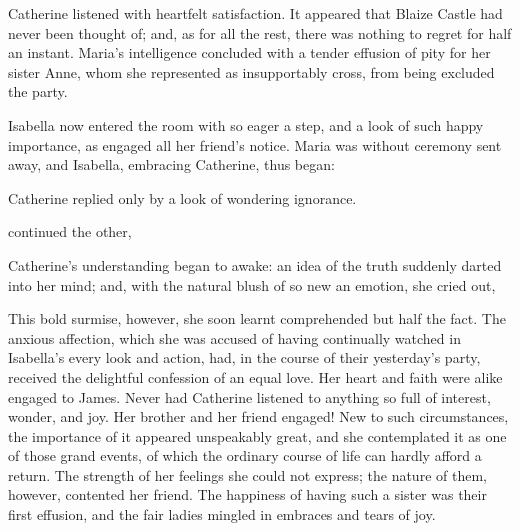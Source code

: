 Catherine listened with heartfelt satisfaction. It appeared that Blaize Castle had never been thought of; and, as for all the rest, there was nothing to regret for half an instant. Maria's intelligence concluded with a tender effusion of pity for her sister Anne, whom she represented as insupportably cross, from being excluded the party.


Isabella now entered the room with so eager a step, and a look of such happy importance, as engaged all her friend's notice. Maria was without ceremony sent away, and Isabella, embracing Catherine, thus began: 

Catherine replied only by a look of wondering ignorance.

 continued the other, 

Catherine's understanding began to awake: an idea of the truth suddenly darted into her mind; and, with the natural blush of so new an emotion, she cried out, 

This bold surmise, however, she soon learnt comprehended but half the fact. The anxious affection, which she was accused of having continually watched in Isabella's every look and action, had, in the course of their yesterday's party, received the delightful confession of an equal love. Her heart and faith were alike engaged to James. Never had Catherine listened to anything so full of interest, wonder, and joy. Her brother and her friend engaged! New to such circumstances, the importance of it appeared unspeakably great, and she contemplated it as one of those grand events, of which the ordinary course of life can hardly afford a return. The strength of her feelings she could not express; the nature of them, however, contented her friend. The happiness of having such a sister was their first effusion, and the fair ladies mingled in embraces and tears of joy.

